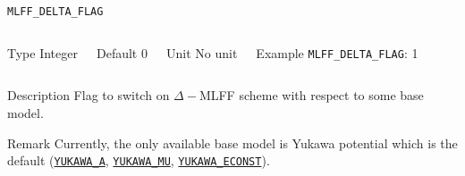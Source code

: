 \begin{frame}[allowframebreaks]{\texttt{{MLFF\_DELTA\_FLAG}}} \label{MLFF_DELTA_FLAG}
\vspace*{-12pt}
\begin{columns}
\begin{block}{Type}
Integer
\end{block}

\begin{block}{Default}
0
\end{block}

\begin{block}{Unit}
No unit
\end{block}

\begin{block}{Example}
\texttt{MLFF\_DELTA\_FLAG}: 1
\end{block}
\end{columns}

\begin{block}{Description}
Flag to switch on $\Delta-$MLFF scheme with respect to some base model.
\end{block}

\begin{block}{Remark}
Currently, the only available base model is Yukawa potential which is the default (\hyperlink{YUKAWA_A}{\texttt{YUKAWA\_A}}, \hyperlink{YUKAWA_MU}{\texttt{YUKAWA\_MU}}, \hyperlink{YUKAWA_ECONST}{\texttt{YUKAWA\_ECONST}}).
\end{block}

\end{frame}

